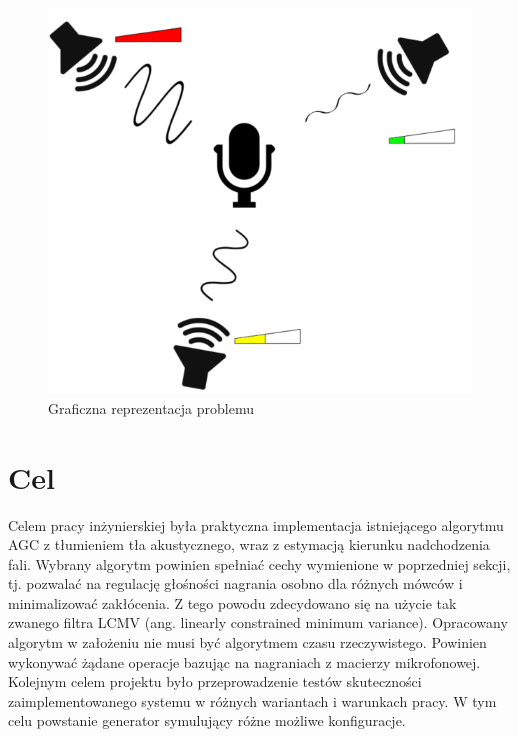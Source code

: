 \begin{figure}[h]
    \centering
    \includegraphics[width=\textwidth]{Images/setup.png}
    \caption{Graficzna reprezentacja problemu}
    \label{fig:setup}
\end{figure}

\section{Cel}
Celem pracy inżynierskiej była praktyczna implementacja istniejącego algorytmu AGC z tłumieniem tła akustycznego, wraz z estymacją kierunku nadchodzenia fali. Wybrany algorytm powinien spełniać cechy wymienione w poprzedniej sekcji, tj. pozwalać na regulację głośności nagrania osobno dla różnych mówców i minimalizować zakłócenia. Z tego powodu zdecydowano się na użycie tak zwanego filtra LCMV (ang. linearly constrained minimum variance). Opracowany algorytm w założeniu nie musi być algorytmem czasu rzeczywistego. Powinien wykonywać żądane operacje bazując na nagraniach z macierzy mikrofonowej. Kolejnym celem projektu było przeprowadzenie testów skuteczności zaimplementowanego systemu w różnych wariantach i warunkach pracy. W tym celu powstanie generator symulujący różne możliwe konfiguracje.

